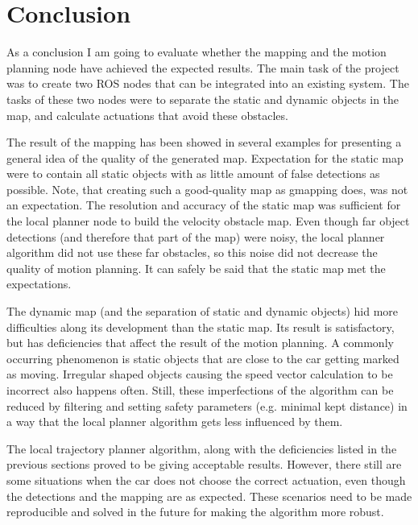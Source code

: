 \chapter{Conclusion}
\label{chap:conclusion}

As a conclusion I am going to evaluate whether the mapping and the motion planning node have achieved the expected results. The main task of the project was to create two ROS nodes that can be integrated into an existing system. The tasks of these two nodes were to separate the static and dynamic objects in the map, and calculate actuations that avoid these obstacles.

The result of the mapping has been showed in several examples for presenting a general idea of the quality of the generated map. Expectation for the static map were to contain all static objects with as little amount of false detections as possible. Note, that creating such a good-quality map as gmapping does, was not an expectation. The resolution and accuracy of the static map was sufficient for the local planner node to build the velocity obstacle map. Even though far object detections (and therefore that part of the map) were noisy, the local planner algorithm did not use these far obstacles, so this noise did not decrease the quality of motion planning. It can safely be said that the static map met the expectations.

The dynamic map (and the separation of static and dynamic objects) hid more difficulties along its development than the static map. Its result is satisfactory, but has deficiencies that affect the result of the motion planning. A commonly occurring phenomenon is static objects that are close to the car getting marked as moving. Irregular shaped objects causing the speed vector calculation to be incorrect also happens often. Still, these imperfections of the algorithm can be reduced by filtering and setting safety parameters (e.g. minimal kept distance) in a way that the local planner algorithm gets less influenced by them.

The local trajectory planner algorithm, along with the deficiencies listed in the previous sections proved to be giving acceptable results. However, there still are some situations when the car does not choose the correct actuation, even though the detections and the mapping are as expected. These scenarios need to be made reproducible and solved in the future for making the algorithm more robust.

